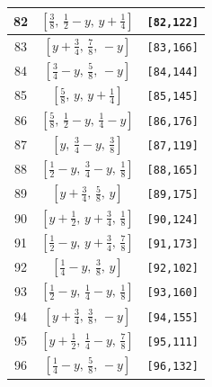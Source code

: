 \documentclass[fleqn,8pt]{jsarticle}
\begin{document}
\begin{longtable}{ccc}
82 & $\left[ \frac{3}{8},\, \frac{1}{2} - y,\, y + \frac{1}{4} \right]$ & {\tt [82,122]} \\ \hline
83 & $\left[ y + \frac{3}{4},\, \frac{7}{8},\, - y \right]$ & {\tt [83,166]} \\ \hline
84 & $\left[ \frac{3}{4} - y,\, \frac{5}{8},\, - y \right]$ & {\tt [84,144]} \\ \hline
85 & $\left[ \frac{5}{8},\, y,\, y + \frac{1}{4} \right]$ & {\tt [85,145]} \\ \hline
86 & $\left[ \frac{5}{8},\, \frac{1}{2} - y,\, \frac{1}{4} - y \right]$ & {\tt [86,176]} \\ \hline
87 & $\left[ y,\, \frac{3}{4} - y,\, \frac{3}{8} \right]$ & {\tt [87,119]} \\ \hline
88 & $\left[ \frac{1}{2} - y,\, \frac{3}{4} - y,\, \frac{1}{8} \right]$ & {\tt [88,165]} \\ \hline
89 & $\left[ y + \frac{3}{4},\, \frac{5}{8},\, y \right]$ & {\tt [89,175]} \\ \hline
90 & $\left[ y + \frac{1}{2},\, y + \frac{3}{4},\, \frac{1}{8} \right]$ & {\tt [90,124]} \\ \hline
91 & $\left[ \frac{1}{2} - y,\, y + \frac{3}{4},\, \frac{7}{8} \right]$ & {\tt [91,173]} \\ \hline
92 & $\left[ \frac{1}{4} - y,\, \frac{3}{8},\, y \right]$ & {\tt [92,102]} \\ \hline
93 & $\left[ \frac{1}{2} - y,\, \frac{1}{4} - y,\, \frac{1}{8} \right]$ & {\tt [93,160]} \\ \hline
94 & $\left[ y + \frac{3}{4},\, \frac{3}{8},\, - y \right]$ & {\tt [94,155]} \\ \hline
95 & $\left[ y + \frac{1}{2},\, \frac{1}{4} - y,\, \frac{7}{8} \right]$ & {\tt [95,111]} \\ \hline
96 & $\left[ \frac{1}{4} - y,\, \frac{5}{8},\, - y \right]$ & {\tt [96,132]} \\
\end{longtable}
\renewcommand{\arraystretch}{1.2}
\end{document}
